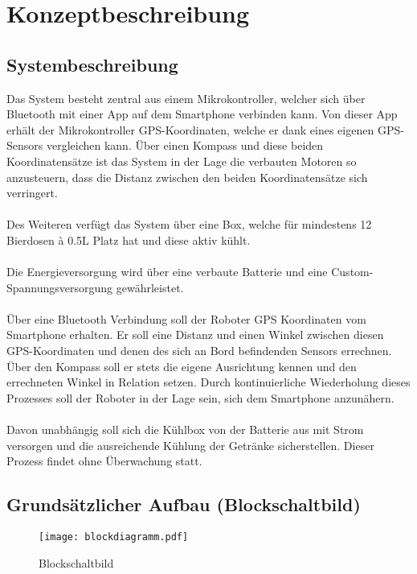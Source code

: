\section{Konzeptbeschreibung}

\subsection{Systembeschreibung}
Das System besteht zentral aus einem Mikrokontroller, welcher sich über Bluetooth mit einer App auf dem Smartphone verbinden kann. Von dieser App erhält der Mikrokontroller GPS-Koordinaten, welche er dank eines eigenen GPS-Sensors vergleichen kann. Über einen Kompass und diese beiden Koordinatensätze ist das System in der Lage die verbauten Motoren so anzusteuern, dass die Distanz zwischen den beiden Koordinatensätze sich verringert. \\
\\
Des Weiteren verfügt das System über eine Box, welche für mindestens 12 Bierdosen à 0.5L Platz hat und diese aktiv kühlt.\\
\\
Die Energieversorgung wird über eine verbaute Batterie und eine Custom-Spannungsversorgung gewährleistet.\\
\\
Über eine Bluetooth Verbindung soll der Roboter GPS Koordinaten vom Smartphone erhalten. Er soll eine Distanz und einen Winkel zwischen diesen GPS-Koordinaten und denen des sich an Bord befindenden Sensors errechnen. Über den Kompass soll er stets die eigene Ausrichtung kennen und den errechneten Winkel in Relation setzen. Durch kontinuierliche Wiederholung dieses Prozesses soll der Roboter in der Lage sein, sich dem Smartphone anzunähern.\\
\\
Davon unabhängig soll sich die Kühlbox von der Batterie aus mit Strom versorgen und die ausreichende Kühlung der Getränke sicherstellen. Dieser Prozess findet ohne Überwachung statt.

\subsection{Grundsätzlicher Aufbau (Blockschaltbild)}
\begin{figure}[H]
    \begin{center}
    \texttt{[image: blockdiagramm.pdf]}
    \end{center}
    \caption{Blockschaltbild}
\end{figure}


